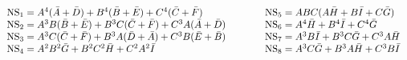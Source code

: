 \begin{equation*}
  \begin{array}{lll}
{\rm NS}_1 =  A^4 (\bar{A}+\bar{D}) + B^4 (\bar{B}+\bar{E}) +C^4
    (\bar{C}+\bar{F}) & \qquad & 
{\rm NS}_5 = ABC (A\bar{H}+B\bar{I}+C\bar{G}) \\ 
{\rm NS}_2 =  A^3 B (\bar{B} +\bar{E}) +B^3 C (\bar{C} +\bar{F}) +C^3
    A(\bar{A}+\bar{D}) & \qquad &  
{\rm NS}_6 = A^4 \bar{H} + B^4 \bar{I} +C^4 \bar{G} \\
{\rm NS}_3 = A^3 C (\bar{C} +\bar{F}) +B^3 A (\bar{D} +\bar{A}) +C^3
    B(\bar{E}+\bar{B}) & \qquad &  
{\rm NS}_7 = A^3 B \bar{I} +B^3 C \bar{G} +C^3 A \bar{H} \\
{\rm NS}_4 = A^2 B^2 \bar{G} + B^2 C^2 \bar{H} + C^2 A^2 \bar{I} & \qquad & 
{\rm NS}_8 = A^3 C \bar{G} +B^3 A \bar{H} +C^3 B \bar{I}
  \end{array}
\end{equation*}

